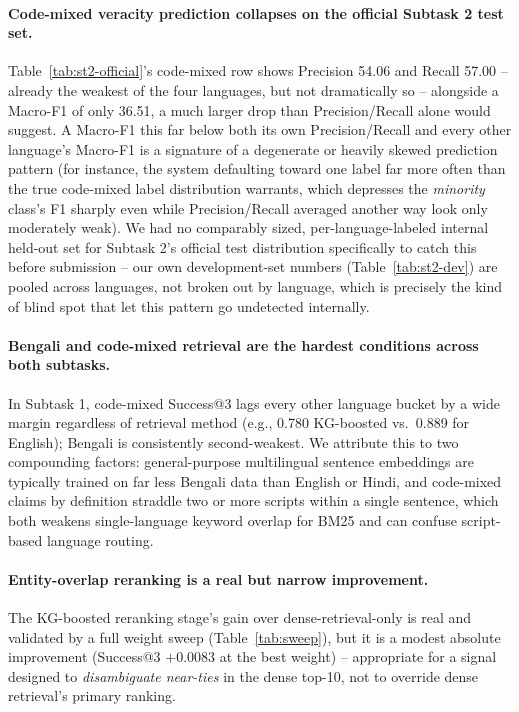 \documentclass[
]{ceurart}
\begin{document}
\paragraph{Code-mixed veracity prediction collapses on the official
Subtask 2 test set.}
Table~\ref{tab:st2-official}'s code-mixed row shows Precision 54.06 and
Recall 57.00 -- already the weakest of the four languages, but not
dramatically so -- alongside a Macro-F1 of only 36.51, a much larger
drop than Precision/Recall alone would suggest. A Macro-F1 this far
below both its own Precision/Recall and every other language's
Macro-F1 is a signature of a degenerate or heavily skewed prediction
pattern (for instance, the system defaulting toward one label far more
often than the true code-mixed label distribution warrants, which
depresses the \emph{minority} class's F1 sharply even while
Precision/Recall averaged another way look only moderately weak). We
had no comparably sized, per-language-labeled internal held-out set for
Subtask 2's official test distribution specifically to catch this
before submission -- our own development-set numbers
(Table~\ref{tab:st2-dev}) are pooled across languages, not broken out
by language, which is precisely the kind of blind spot that let this
pattern go undetected internally.

\paragraph{Bengali and code-mixed retrieval are the hardest conditions
across both subtasks.}
In Subtask 1, code-mixed Success@3 lags every other language bucket by
a wide margin regardless of retrieval method (e.g., 0.780 KG-boosted
vs.\ 0.889 for English); Bengali is consistently second-weakest. We
attribute this to two compounding factors: general-purpose multilingual
sentence embeddings are typically trained on far less Bengali data than
English or Hindi, and code-mixed claims by definition straddle two or
more scripts within a single sentence, which both weakens
single-language keyword overlap for BM25 and can confuse script-based
language routing.

\paragraph{Entity-overlap reranking is a real but narrow improvement.}
The KG-boosted reranking stage's gain over dense-retrieval-only is real
and validated by a full weight sweep (Table~\ref{tab:sweep}), but it is
a modest absolute improvement (Success@3 $+0.0083$ at the best weight)
-- appropriate for a signal designed to \emph{disambiguate near-ties}
in the dense top-10, not to override dense retrieval's primary ranking.
\end{document}
